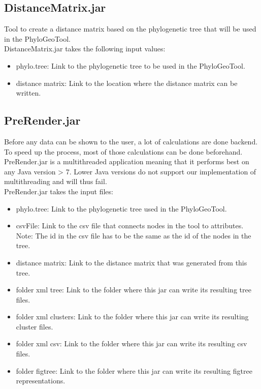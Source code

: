 \documentclass[a4paper, 11pt]{article} %
\begin{document}
\subsection{DistanceMatrix.jar}
Tool to create a distance matrix based on the phylogenetic tree that will be used in the PhyloGeoTool.
\\
DistanceMatrix.jar takes the following input values:
\begin{itemize}
\item phylo.tree: Link to the phylogenetic tree to be used in the PhyloGeoTool.
\item distance matrix: Link to the location where the distance matrix can be written.
\end{itemize}

\subsection{PreRender.jar}
Before any data can be shown to the user, a lot of calculations are done backend. To speed up the process, most of those calculations can be done beforehand.
\\
PreRender.jar is a multithreaded application meaning that it performs best on any Java version > 7. Lower Java versions do not support our implementation of multithreading and will thus fail.
\\
PreRender.jar takes the input files:
\begin{itemize}
\item phylo.tree: Link to the phylogenetic tree used in the PhyloGeoTool.
\item csvFile: Link to the csv file that connects nodes in the tool to attributes. Note: The id in the csv file has to be the same as the id of the nodes in the tree.
\item distance matrix: Link to the distance matrix that was generated from this tree.
\item folder xml tree: Link to the folder where this jar can write its resulting tree files.
\item folder xml clusters: Link to the folder where this jar can write its resulting cluster files.
\item folder xml csv: Link to the folder where this jar can write its resulting csv files.
\item folder figtree: Link to the folder where this jar can write its resulting figtree representations.
\end{itemize}
\end{document}
